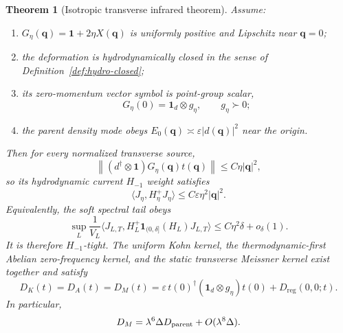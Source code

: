 \documentclass[11pt]{article}
\newtheorem{theorem}{Theorem}[section]
\theoremstyle{definition}
\theoremstyle{remark}
\newcommand{\Id}{\mathbf 1}
\newcommand{\norm}[1]{\left\lVert #1\right\rVert}
\newcommand{\abs}[1]{\left\lvert #1\right\rvert}
\newcommand{\eps}{\varepsilon}
\newcommand{\bq}{\bm q}
\begin{document}
\begin{theorem}[Isotropic transverse infrared theorem]
\label{thm:isotropic}
Assume:
\begin{enumerate}
\item $G_\eta(\bq)=\Id+2\eta X(\bq)$ is uniformly positive and Lipschitz near
$\bq=0$;
\item the deformation is hydrodynamically closed in the sense of
Definition~\ref{def:hydro-closed};
\item its zero-momentum vector symbol is point-group scalar,
\begin{equation}
 G_\eta(0)=\Id_d\otimes g_\eta,
 \qquad g_\eta\succ0;
 \label{eq:pointgroup-scalar}
\end{equation}
\item the parent density mode obeys
$E_0(\bq)\asymp\eps\abs{d(\bq)}^2$ near the origin.
\end{enumerate}
Then for every normalized transverse source,
\begin{equation}
 \norm{(d^\dagger\otimes\Id)G_\eta(\bq)t(\bq)}
 \le C\eta\abs{\bq}^2,
 \label{eq:q2-mixing}
\end{equation}
so its hydrodynamic current $H_{-1}$ weight satisfies
\begin{equation}
 \langle J_\eta,H_\eta^+J_\eta\rangle
 \le C\eps\eta^2\abs{\bq}^2.
 \label{eq:hminusone-q2}
\end{equation}
Equivalently, the soft spectral tail obeys
\begin{equation}
 \sup_L\frac1{V_L}
 \langle J_{L,T},H_L^+\mathbf1_{(0,\delta]}(H_L)J_{L,T}\rangle
 \le C\eta^2\delta+o_\delta(1).
 \label{eq:tail-delta}
\end{equation}
It is therefore $H_{-1}$-tight.  The uniform Kohn kernel, the
thermodynamic-first Abelian zero-frequency kernel, and the static transverse
Meissner kernel exist together and satisfy
\begin{equation}
 \boxed{
 D_K(t)=D_A(t)=D_M(t)
 =\eps\,t(0)^\dagger(\Id_d\otimes g_\eta)t(0)
 +D_{\mathrm{reg}}(0,0;t).}
 \label{eq:isotropic-identification}
\end{equation}
In particular,
\begin{equation}
 D_M=\lambda^6\Delta D_{\rm parent}+O(\lambda^8\Delta).
 \label{eq:isotropic-transfer}
\end{equation}
\end{theorem}
\end{document}
